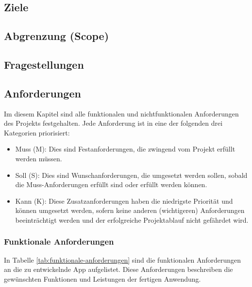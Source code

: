 \subsection{Ziele}

\subsection{Abgrenzung (Scope)}

\subsection{Fragestellungen}

\subsection{Anforderungen}
Im diesem Kapitel sind alle funktionalen und nichtfunktionalen Anforderungen des Projekts festgehalten. Jede Anforderung ist in eine der folgenden drei Kategorien priorisiert:
\begin{itemize}
	\item Muss (M): Dies sind Festanforderungen, die zwingend vom Projekt erfüllt werden müssen.
	\item Soll (S): Dies sind Wunschanforderungen, die umgesetzt werden sollen, sobald die Muss-Anforderungen erfüllt sind oder erfüllt werden können.
	\item Kann (K): Diese Zusatzanforderungen haben die niedrigste Priorität und können umgesetzt werden, sofern keine anderen (wichtigeren) Anforderungen beeinträchtigt werden und der erfolgreiche Projektablauf nicht gefährdet wird.
\end{itemize}

\subsubsection{Funktionale Anforderungen}
In Tabelle \ref{tab:funktionale-anforderungen} sind die funktionalen Anforderungen an die zu entwickelnde App aufgelistet. Diese Anforderungen beschreiben die gewünschten Funktionen und Leistungen der fertigen Anwendung.

